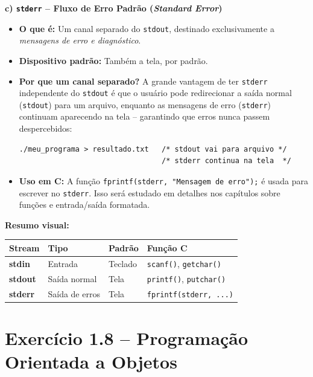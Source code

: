 \documentclass[12pt,a4paper]{article}
\begin{document}
\begin{respostabox}
\bigskip

\textbf{c) \texttt{stderr} -- Fluxo de Erro Padrão (\textit{Standard Error})}

\begin{itemize}
  \item \textbf{O que é:} Um canal separado do \texttt{stdout}, destinado exclusivamente
  a \textit{mensagens de erro e diagnóstico}.
  \item \textbf{Dispositivo padrão:} Também a tela, por padrão.
  \item \textbf{Por que um canal separado?} A grande vantagem de ter \texttt{stderr}
  independente do \texttt{stdout} é que o usuário pode redirecionar a saída normal
  (\texttt{stdout}) para um arquivo, enquanto as mensagens de erro (\texttt{stderr})
  continuam aparecendo na tela -- garantindo que erros nunca passem despercebidos:
  \begin{lstlisting}
./meu_programa > resultado.txt   /* stdout vai para arquivo */
                                 /* stderr continua na tela  */
  \end{lstlisting}
  \item \textbf{Uso em C:} A função \texttt{fprintf(stderr, "Mensagem de erro\n");}
  é usada para escrever no \texttt{stderr}. Isso será estudado em detalhes nos
  capítulos sobre funções e entrada/saída formatada.
\end{itemize}

\medskip
\textbf{Resumo visual:}

\begin{center}
\renewcommand{\arraystretch}{1.4}
\begin{tabular}{>{\ttfamily\bfseries}l l l l}
  \toprule
  \normalfont\textbf{Stream} & \textbf{Tipo} & \textbf{Padrão} & \textbf{Função C} \\
  \midrule
  stdin  & Entrada  & Teclado & \texttt{scanf()}, \texttt{getchar()} \\
  stdout & Saída normal & Tela & \texttt{printf()}, \texttt{putchar()} \\
  stderr & Saída de erros & Tela & \texttt{fprintf(stderr, ...)} \\
  \bottomrule
\end{tabular}
\end{center}

\end{respostabox}

\newpage

\section{Exercício 1.8 -- Programação Orientada a Objetos}
\end{document}
